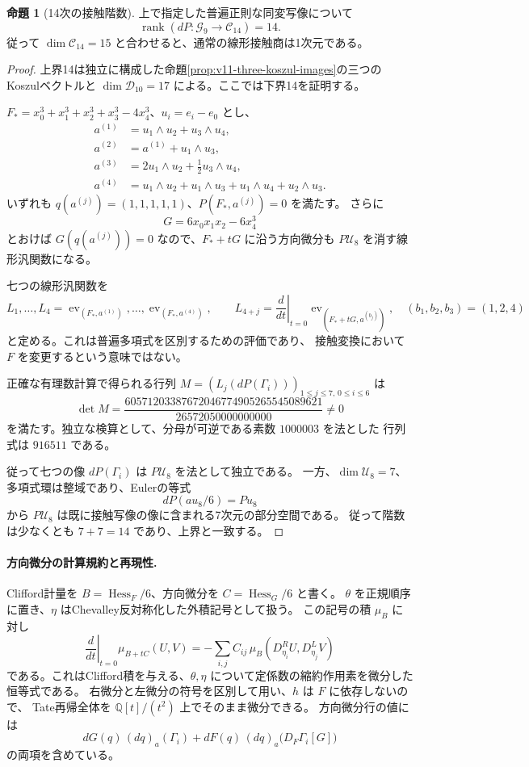 \documentclass[a4paper,11pt]{ltjsarticle}
\theoremstyle{definition}
\newtheorem{proposition}[theorem]{命題}
\begin{document}
\begin{proposition}[14次の接触階数]
\label{prop:v11-contact-rank-fourteenth}
上で指定した普遍正則な同変写像について
\[
 \operatorname{rank}(dP\colon\mathcal G_9\longrightarrow\mathcal C_{14})=14.
\]
従って $\dim\mathcal C_{14}=15$ と合わせると、通常の線形接触商は1次元である。
\end{proposition}
\begin{proof}
上界14は独立に構成した命題\ref{prop:v11-three-koszul-images}の三つのKoszulベクトルと
$\dim\mathcal D_{10}=17$ による。ここでは下界14を証明する。

$F_*=x_0^3+x_1^3+x_2^3+x_3^3-4x_4^3$、$u_i=e_i-e_0$ とし、
\begin{align*}
 a^{(1)}&=u_1\wedge u_2+u_3\wedge u_4,\\
 a^{(2)}&=a^{(1)}+u_1\wedge u_3,\\
 a^{(3)}&=2u_1\wedge u_2+\tfrac12u_3\wedge u_4,\\
 a^{(4)}&=u_1\wedge u_2+u_1\wedge u_3
              +u_1\wedge u_4+u_2\wedge u_3.
\end{align*}
いずれも $q(a^{(j)})=(1,1,1,1,1)$、$P(F_*,a^{(j)})=0$ を満たす。
さらに
\[
 G=6x_0x_1x_2-6x_4^3
\]
とおけば $G(q(a^{(j)}))=0$ なので、$F_*+tG$ に沿う方向微分も
$P\mathcal U_8$ を消す線形汎関数になる。

七つの線形汎関数を
\[
 L_1,\ldots,L_4=\operatorname{ev}_{(F_*,a^{(1)})},\ldots,
                   \operatorname{ev}_{(F_*,a^{(4)})},
 \qquad
 L_{4+j}=\left.\frac{d}{dt}\right|_{t=0}
             \operatorname{ev}_{(F_*+tG,a^{(b_j)})},
 \quad (b_1,b_2,b_3)=(1,2,4)
\]
と定める。これは普遍多項式を区別するための評価であり、
接触変換において $F$ を変更するという意味ではない。

正確な有理数計算で得られる行列
$M=(L_j(dP(\Gamma_i)))_{1\le j\le7,\,0\le i\le6}$ は
\[
 \det M=
 \frac{60571203387672046774905265545089621}{26572050000000000}\ne0
\]
を満たす。独立な検算として、分母が可逆である素数 $1000003$ を法とした
行列式は $916511$ である。

従って七つの像 $dP(\Gamma_i)$ は $P\mathcal U_8$ を法として独立である。
一方、$\dim\mathcal U_8=7$、多項式環は整域であり、Eulerの等式
\[
 dP(a u_8/6)=P u_8
\]
から $P\mathcal U_8$ は既に接触写像の像に含まれる7次元の部分空間である。
従って階数は少なくとも $7+7=14$ であり、上界と一致する。
\end{proof}

\paragraph{方向微分の計算規約と再現性.}
Clifford計量を $B=\operatorname{Hess}_F/6$、方向微分を
$C=\operatorname{Hess}_G/6$ と書く。
$\theta$ を正規順序に置き、$\eta$ はChevalley反対称化した外積記号として扱う。
この記号の積 $\mu_B$ に対し
\[
 \left.\frac{d}{dt}\right|_{t=0}\mu_{B+tC}(U,V)
 =-\sum_{i,j} C_{ij}\,
       \mu_B(D^R_{\eta_i}U,D^L_{\eta_j}V)
\]
である。これはClifford積を与える、$\theta,\eta$ について定係数の縮約作用素を微分した恒等式である。
右微分と左微分の符号を区別して用い、$h$ は $F$ に依存しないので、
Tate再帰全体を $\mathbb Q[t]/(t^2)$ 上でそのまま微分できる。
方向微分行の値には
\[
 dG(q)\,(dq)_a(\Gamma_i)
 +dF(q)\,(dq)_a\bigl(D_F\Gamma_i[G]\bigr)
\]
の両項を含めている。
\end{document}
